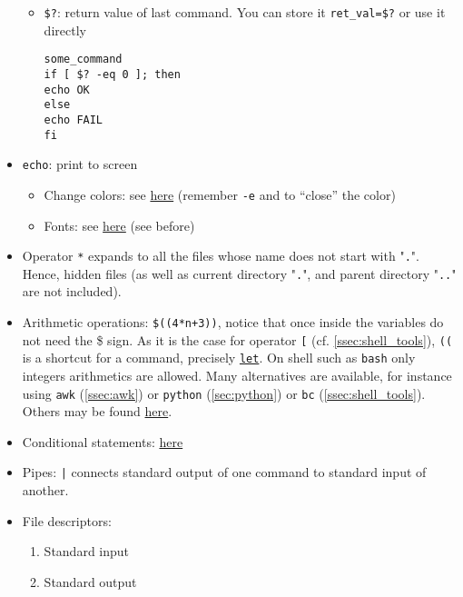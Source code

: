 \documentclass[a4paper,12pt,%
              final%
              ]{article}
\begin{document}
\begin{itemize}
\begin{itemize}
      \item \verb|$?|: return value of last command. You can store it \verb|ret_val=$?| or use it directly
\begin{verbatim}
some_command
if [ $? -eq 0 ]; then
echo OK
else
echo FAIL
fi
\end{verbatim}
    \end{itemize}
  \item \texttt{echo}: print to screen
    \begin{itemize}
      \item Change colors: see \href{https://stackoverflow.com/questions/5947742/how-to-change-the-output-color-of-echo-in-linux}{here} (remember \verb|-e| and to ``close'' the color)
      \item Fonts: see \href{https://askubuntu.com/questions/528928/how-to-do-underline-bold-italic-strikethrough-color-background-and-size-i}{here} (see before)
    \end{itemize}
  \item Operator \texttt{*} expands to all the files whose name does not start with "\texttt{.}". Hence, hidden files (as well as current directory "\texttt{.}", and parent directory "\texttt{..}" are not included).
  \item Arithmetic operations: \verb|$((4*n+3))|, notice that once inside the variables do not need the \$ sign. As it is the case for operator \verb|[| (cf. \autoref{ssec:shell_tools}), \verb|((| is a shortcut for a command, precisely \href{https://www.computerhope.com/unix/bash/let.htm}{\texttt{let}}. On shell such as \texttt{bash} only integers arithmetics are allowed. Many alternatives are available, for instance using \texttt{awk} (\autoref{ssec:awk}) or \texttt{python} (\autoref{sec:python}) or \texttt{bc} (\autoref{ssec:shell_tools}). Others may be found \href{https://unix.stackexchange.com/questions/40786/how-to-do-integer-float-calculations-in-bash-or-other-languages-frameworks}{here}.
  \item Conditional statements: \href{https://unix.stackexchange.com/questions/306111/what-is-the-difference-between-the-bash-operators-vs-vs-vs}{here}
  \item Pipes: \verb!|! connects standard output of one command to standard input of another.
  \item File descriptors:
    \begin{enumerate}[start=0,label={\texttt{\arabic*} :}]
      \item Standard input
      \item Standard output

\end{enumerate}
\end{itemize}
\end{document}
